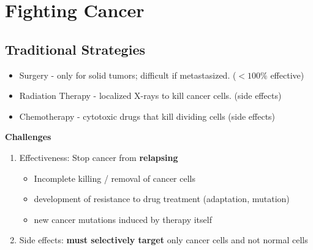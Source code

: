 \documentclass[10pt]{article}
\begin{document}
\section*{Fighting Cancer}
\subsection*{Traditional Strategies}
\begin{itemize}
	\item Surgery - only for solid tumors; difficult if metastasized.  ($< 100\%$ effective)
	\item Radiation Therapy - localized X-rays to kill cancer cells.  (side effects)
	\item Chemotherapy - cytotoxic drugs that kill dividing cells  (side effects)
\end{itemize}
\textbf{Challenges}
\begin{enumerate}
	\item Effectiveness: Stop cancer from \textbf{relapsing}
	\begin{itemize}
        \item Incomplete killing / removal of cancer cells
        \item development of resistance to drug treatment (adaptation, mutation)
        \item new cancer mutations induced by therapy itself
    \end{itemize}
    \item Side effects: \textbf{must selectively target} only cancer cells and not normal cells
\end{enumerate}
\end{document}

